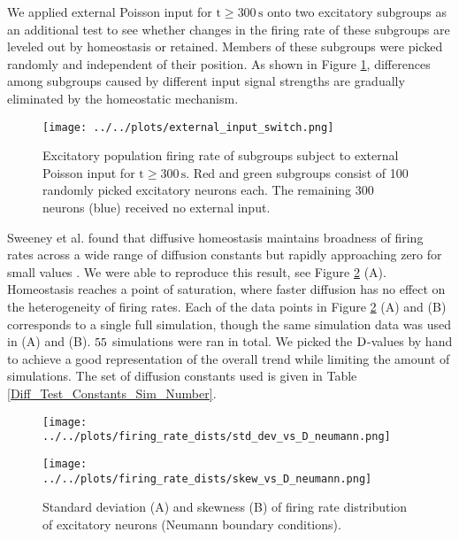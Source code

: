 \documentclass[10pt,a4paper]{article}
\begin{document}
We applied external Poisson input for $\mathrm{t\geq 300\, s}$ onto two excitatory subgroups as an additional test to see whether changes in the firing rate of these subgroups are leveled out by homeostasis or retained. Members of these subgroups were picked randomly and independent of their position. As shown in Figure \ref{Ext_Input_Switch}, differences among subgroups caused by different input signal strengths are gradually eliminated by the homeostatic mechanism.
\begin{figure}
\begin{center}
\texttt{[image: ../../plots/external\_input\_switch.png]}
\end{center}
\caption{Excitatory population firing rate of subgroups subject to external Poisson input for $\mathrm{t\geq 300\, s}$. Red and green subgroups consist of 100 randomly picked excitatory neurons each. The remaining 300 neurons (blue) received no external input.}
\label{Ext_Input_Switch}
\end{figure}

Sweeney et al. found that diffusive homeostasis maintains broadness of firing rates across a wide range of diffusion constants but rapidly approaching zero for small values \cite[p. 6]{Sweeney_Paper}. We were able to reproduce this result, see Figure \ref{Fir_Rate_Dist_Width_Skewness_vs_D} (A). Homeostasis reaches a point of saturation, where faster diffusion has no effect on the heterogeneity of firing rates. Each of the data points in Figure \ref{Fir_Rate_Dist_Width_Skewness_vs_D} (A) and (B) corresponds to a single full simulation, though the same simulation data was used in (A) and (B). $\rm 55$ simulations were ran in total. We picked the $\rm D$-values by hand to achieve a good representation of the overall trend while limiting the amount of simulations. The set of diffusion constants used is given in Table \ref{Diff_Test_Constants_Sim_Number}.
\begin{figure}
\begin{minipage}{0.5\textwidth}
\texttt{[image: ../../plots/firing\_rate\_dists/std\_dev\_vs\_D\_neumann.png]}
\end{minipage}
\begin{minipage}{0.5\textwidth}
\texttt{[image: ../../plots/firing\_rate\_dists/skew\_vs\_D\_neumann.png]}
\end{minipage}
\caption{Standard deviation (A) and skewness (B) of firing rate distribution of excitatory neurons (Neumann boundary conditions).}
\label{Fir_Rate_Dist_Width_Skewness_vs_D}
\end{figure}
\end{document}
